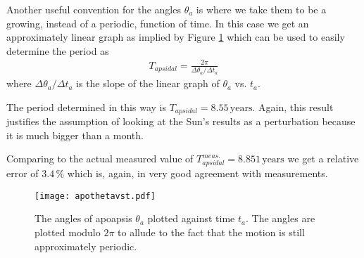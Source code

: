 \documentclass[12pt,a4paper]{article}
\begin{document}
Another useful convention for the angles $\theta_a$ is where we take them to be a growing, instead of a periodic, function of time. In this case we get an approximately linear graph as implied by Figure \ref{apotheta} which can be used to easily determine the period as
%
\begin{align}
T_{apsidal} = \frac{2 \pi}{\Delta \theta_a / \Delta t_a}
\end{align}
%
where $\Delta \theta_a / \Delta t_a$ is the slope of the linear graph of $\theta_a$ vs. $t_a$.

The period determined in this way is $T_{apsidal} = 8.55 \, \mathrm{years}$. Again, this result justifies the assumption of looking at the Sun's results as a perturbation because it is much bigger than a month.

Comparing to the actual measured value of $T_{apsidal}^{meas.} = 8.851 \, \mathrm{years}$ we get a relative error of $3.4 \, \%$ which is, again, in very good agreement with measurements.

\begin{figure}[H]
\centering
\captionsetup{justification=centering}
\texttt{[image: apothetavst.pdf]}
\caption{The angles of apoapsis $\theta_a$ plotted against time $t_a$. The angles are plotted modulo $2 \pi$ to allude to the fact that the motion is still approximately periodic.}
\label{apotheta}
\end{figure}

\newpage

\printbibliography
\end{document}
